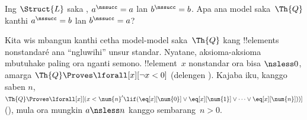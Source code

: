 \documentclass[../../../include/open-logic-section]{subfiles}
\begin{document}
\begin{prob}
Ing $\Struct{L}$
saka
,
$a^\nssucc
= a$ lan
$b^\nssucc = b$.
Apa ana model saka~$\Th{Q}$
kanthi
$a^\nssucc = b$
lan $b^\nssucc = a$?
\end{prob}

\begin{explain}
Kita wis mbangun kanthi
cetha model-model
saka~$\Th{Q}$
kang !!{element}s
nonstandaré ana
“ngluwihi” unsur standar.
Nyatane, aksioma-aksioma
mbutuhake paling ora
nganti semono.
!!{element}~$x$
nonstandar ora bisa
${} \nsless 0$,
amarga
$\Th{Q} \Proves
\lforall[x][\lnot x<0]$
(delengen
).
Kajaba iku,
kanggo saben $n$,
$\Th{Q} \Proves \lforall[x][(x < \num{n}' \lif
(\eq[x][\num{0}] \lor \eq[x][\num{1}] \lor \dots \lor
\eq[x][\num{n}]))]$
(),
mula ora mungkin
$a \nsless n$
kanggo sembarang~$n>0$.
\end{explain}
\end{document}
